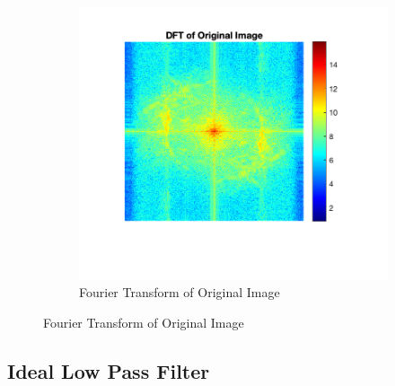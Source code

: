 \documentclass[12pt]{article}
\begin{document}
\begin{figure}[H]
\begin{subfigure}{.5\textwidth}
      \includegraphics[width=1\linewidth]{../images/barbara_original_DFT.png}
      \caption{Fourier Transform of Original Image}
    \end{subfigure}
\end{figure}

\subsection*{Ideal Low Pass Filter}
\end{document}
